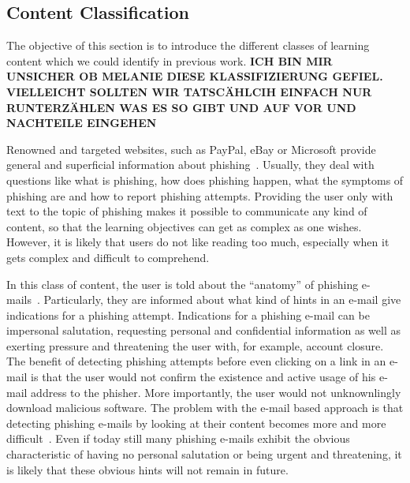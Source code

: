 \subsection{Content Classification}
The objective of this section is to introduce the different classes of learning content which we could identify in previous work.
\textbf{ICH BIN MIR UNSICHER OB MELANIE DIESE KLASSIFIZIERUNG GEFIEL. VIELLEICHT SOLLTEN WIR TATSCÄHLCIH EINFACH NUR RUNTERZÄHLEN WAS ES SO GIBT UND AUF VOR UND NACHTEILE EINGEHEN}
\begin{description}[leftmargin=0cm]
	\item[General Knowledge Transfer] Renowned and targeted websites, such as PayPal, eBay or Microsoft provide general and superficial  information about phishing~\cite{generalknowledgemicrosoft, generalknowledgepaypal, generalknowledgeebay}. Usually, they deal with questions like what is phishing, how does phishing happen, what the symptoms of phishing are and how to report phishing attempts. Providing the user only with text to the topic of phishing makes it possible to communicate any kind of content, so that the learning objectives can get as complex as one wishes. However, it is likely that users do not like reading too much, especially when it gets complex and difficult to comprehend.
	\item[E-Mail Based Knowledge] In this class of content, the user is told about the ``anatomy'' of phishing e-mails~\cite{antiphishingphyllis, sonicwall}. Particularly, they are informed about what kind of hints in an e-mail give indications for a phishing attempt. Indications for a phishing e-mail can be impersonal salutation, requesting personal and confidential information as well as exerting pressure and threatening the user with, for example, account closure. The benefit of detecting phishing attempts before even clicking on a link in an e-mail is that the user would not confirm the existence and active usage of his e-mail address to the phisher. More importantly, the user would not unknownlingly download malicious software. The problem with the e-mail based approach is that detecting phishing e-mails by looking at their content becomes more and more difficult~\cite{microsoftphishing,spamfighter}. Even if today still many phishing e-mails exhibit the obvious characteristic of having no personal salutation or being urgent and threatening, it is likely that these obvious hints will not remain in future.

\end{description}
